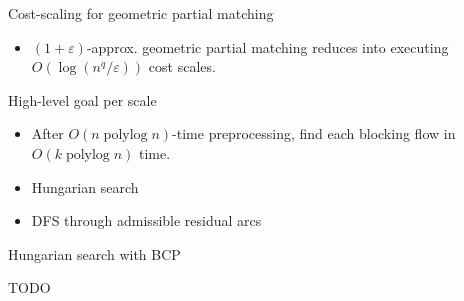 \documentclass[xcolor={dvipsnames,usenames},handout]{beamer} %
\newcommand{\eps}{\varepsilon}
\DeclareMathOperator{\polylog}{polylog}
\begin{document}
\begin{frame}{Cost-scaling for geometric partial matching}
\begin{itemize}
\item $(1+\eps)$-approx. geometric partial matching reduces into executing $O(\log(n^q/\eps))$ cost scales.
\end{itemize}
\end{frame}

\begin{frame}
\end{frame}

\begin{frame}{High-level goal per scale}
\begin{itemize}
\item After $O(n\polylog n)$-time preprocessing, find each blocking flow in $O(k\polylog n)$ time.
\vspace{15pt}
\item Hungarian search
\item DFS through admissible residual arcs
\end{itemize}
\end{frame}

\begin{frame}{Hungarian search with BCP}
\end{frame}


\begin{frame}
\end{frame}

\begin{frame}
\end{frame}

\begin{frame}
\end{frame}

\begin{frame}
\end{frame}

\begin{frame}
\end{frame}

\begin{frame}{TODO}
\end{frame}
\end{document}
